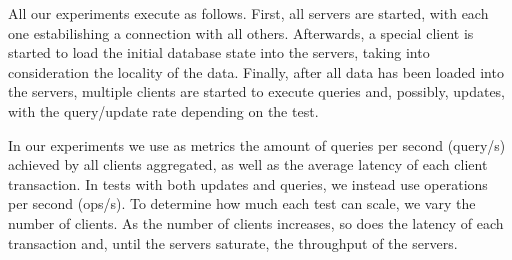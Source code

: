 \documentclass{vldb}
\newcommand{\grumbler}[2]{{\color{red}{\bf #1:} #2}}
\renewcommand{\grumbler}[2]{}
\newcommand{\andre}[1]{\grumbler{andre}{#1}}
\begin{document}

All our experiments execute as follows.
First, all servers are started, with each one estabilishing a connection with all others.
Afterwards, a special client is started to load the initial database state into the servers, taking into consideration the locality of the data.
Finally, after all data has been loaded into the servers, multiple clients are started to execute queries and, possibly, updates, with the query/update rate depending on the test.

In our experiments we use as metrics the amount of queries per second (query/s) achieved by all clients aggregated, as well as the average latency of each client transaction.
In tests with both updates and queries, we instead use operations per second (ops/s).
To determine how much each test can scale, we vary the number of clients.
As the number of clients increases, so does the latency of each transaction and, until the servers saturate, the throughput of the servers.
\end{document}
